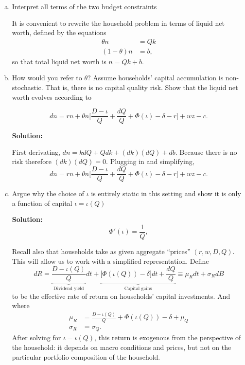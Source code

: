 \documentclass[11pt]{extarticle}
\theoremstyle{plain}
\theoremstyle{definition}
\begin{document}
\begin{enumerate}[(a)]
 \item Interpret all terms of the two budget constraints


 It is convenient to rewrite the household problem in terms of liquid net worth, defined by the equations 
\begin{align*}
	\theta n &= Q k \\
	(1-\theta) n &= b,
\end{align*}
so that total liquid net worth is $n = Qk + b$.

\item How would you refer to $\theta$? Assume households' capital accumulation is non-stochastic. That is, there is no capital quality risk. Show that the liquid net worth evolves according to 

\begin{equation*}
	dn = rn +  \theta n \bigg[ \frac{D - \iota }{Q} +  \frac{dQ}{Q} + \Phi(\iota) - \delta - r \bigg]  + w z - c .
\end{equation*}
 
\textbf{Solution:} 

 First derivating, $dn = k dQ + Q dk + (dk)(dQ) + db$. Because there is no risk therefore $(dk)(dQ) = 0$. Plugging in and simplifying, 
\begin{equation*}
	dn = rn +  \theta n \bigg[ \frac{D - \iota }{Q} +  \frac{dQ}{Q} + \Phi(\iota) - \delta - r \bigg]  + w z - c .
\end{equation*}


\item Argue why the choice of $\iota$ is entirely static in this setting and show it is only a function of capital $\iota = \iota(Q)$ 

\textbf{Solution:}
\begin{equation*}
	\Phi'(\iota) = \frac{1}{Q},
\end{equation*}


  Recall also that households take as given aggregate ``prices'' $(r, w, D, Q)$.  This will allow us to work with a simplified representation. Define 
\begin{equation*}
	dR = \underbrace{\frac{D - \iota (Q) }{Q}}_\text{Dividend yield} dt + \underbrace{\Big[\Phi(\iota(Q)) - \delta \Big] dt +  \frac{dQ}{Q}}_\text{Capital gains} \equiv \mu_R dt + \sigma_R dB
\end{equation*}
to be the effective rate of return on households' capital investments. And where
\begin{align*}
	\mu_R &= \frac{D - \iota (Q) }{Q}  + \Phi(\iota(Q)) - \delta + \mu_Q \\
	\sigma_R &= \sigma_Q. 
\end{align*}
After solving for $\iota = \iota(Q)$, this return is exogenous from the perspective of the household: it depends on macro conditions and prices, but not on the particular portfolio composition of the household.


\end{enumerate}
\end{document}
